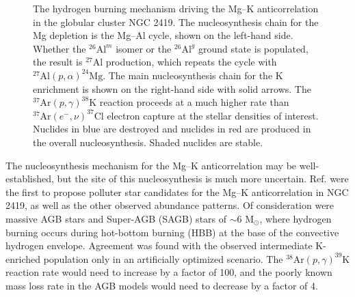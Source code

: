 \begin{figure}[t]
\begin{minipage}{.44\linewidth}
\begin{tikzpicture}[scale=1.5, every node/.style={transform shape}]
\end{tikzpicture}
\end{minipage}
\vspace{0.75 cm}
\caption{\label{fig:MgKHBurning}The hydrogen burning mechanism driving the Mg--K anticorrelation in the globular cluster NGC 2419. The nucleosynthesis chain for the Mg depletion is the Mg--Al cycle, shown on the left-hand side. Whether the $^{26}\mathrm{Al}^{m}$ isomer or the $^{26}\mathrm{Al}^{g}$ ground state is populated, the result is $^{27}$Al production, which repeats the cycle with $^{27}\mathrm{Al}(p,\alpha)^{24}\mathrm{Mg}$. The main nucleosynthesis chain for the K enrichment is shown on the right-hand side with solid arrows. The $^{37}\mathrm{Ar}(p, \gamma)^{38}\mathrm{K}$ reaction proceeds at a much higher rate than $^{37}\mathrm{Ar}(e^{-},\nu)^{37}\mathrm{Cl}$ electron capture at the stellar densities of interest. Nuclides in blue are destroyed and nuclides in red are produced in the overall nucleosynthesis. Shaded nuclides are stable.}
\end{figure}


The nucleosynthesis mechanism for the Mg--K anticorrelation may be well-established, but the site of this nucleosynthesis is much more uncertain. Ref. \cite{Ventura2012} were the first to propose polluter star candidates for the Mg--K anticorrelation in NGC 2419, as well as the other observed abundance patterns. Of consideration were massive AGB stars and Super-AGB (SAGB) stars of $\sim 6$ $\mathrm{M}_{\odot}$, where hydrogen burning occurs during hot-bottom burning (HBB) at the base of the convective hydrogen envelope. Agreement was found with the observed intermediate K-enriched population only in an artificially optimized scenario. The $^{38}\mathrm{Ar}(p,\gamma)^{39}\mathrm{K}$ reaction rate would need to increase by a factor of 100, and the poorly known mass loss rate in the AGB models would need to decrease by a factor of 4.


